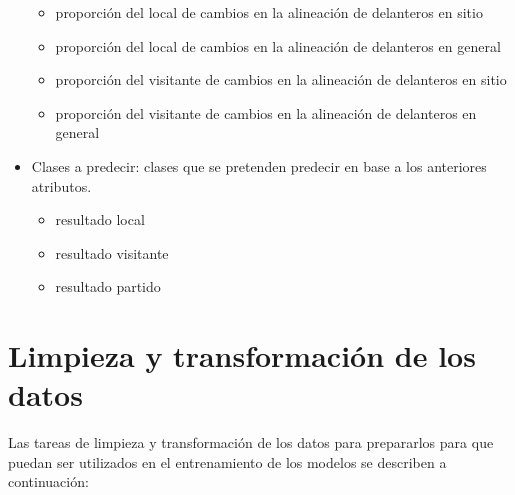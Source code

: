 \begin{itemize}
\begin{itemize}
              \item proporción del local de cambios en la alineación de delanteros en sitio
              \item proporción del local de cambios en la alineación de delanteros en general
              \item proporción del visitante de cambios en la alineación de delanteros en sitio
              \item proporción del visitante de cambios en la alineación de delanteros en general
          \end{itemize}
    \item Clases a predecir: clases que se pretenden predecir en base a los anteriores atributos.
          \begin{itemize}
              \item resultado local
              \item resultado visitante
              \item resultado partido
          \end{itemize}
\end{itemize}




\section{Limpieza y transformación de los datos}
Las tareas de limpieza y transformación de los datos para prepararlos para que puedan ser utilizados en el entrenamiento de los modelos se describen a continuación:

